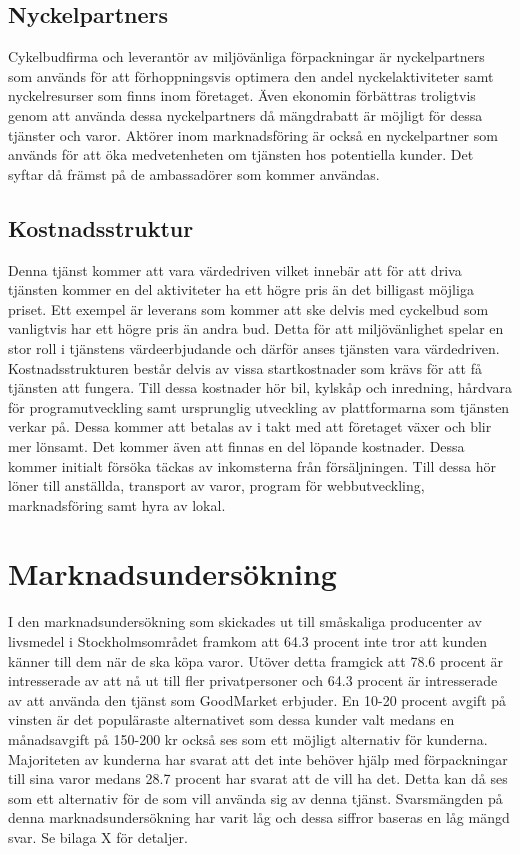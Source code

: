 \documentclass[10pt,a4paper,oneside]{article}
\begin{document}
\subsection{Nyckelpartners}
Cykelbudfirma och leverantör av miljövänliga förpackningar är nyckelpartners som används för att förhoppningsvis optimera den andel nyckelaktiviteter samt nyckelresurser som finns inom företaget. Även ekonomin förbättras troligtvis genom att använda dessa nyckelpartners då mängdrabatt är möjligt för dessa tjänster och varor. Aktörer inom marknadsföring är också en nyckelpartner som används för att öka medvetenheten om tjänsten hos potentiella kunder. Det syftar då främst på de ambassadörer som kommer användas. 

\subsection{Kostnadsstruktur}
Denna tjänst kommer att vara värdedriven vilket innebär att för att driva tjänsten kommer en del aktiviteter ha ett högre pris än det billigast möjliga priset. Ett exempel är leverans som kommer att ske delvis med cyckelbud som vanligtvis har ett högre pris än andra bud. Detta för att miljövänlighet spelar en stor roll i tjänstens värdeerbjudande och därför anses tjänsten vara värdedriven.\\ 

Kostnadsstrukturen består delvis av vissa startkostnader som krävs för att få tjänsten att fungera. Till dessa kostnader hör bil, kylskåp och inredning, hårdvara för programutveckling samt ursprunglig utveckling av plattformarna som tjänsten verkar på. Dessa kommer att betalas av i takt med att företaget växer och blir mer lönsamt. Det kommer även att finnas en del löpande kostnader. Dessa kommer initialt försöka täckas av inkomsterna från försäljningen. Till dessa hör löner till anställda, transport av varor, program för webbutveckling, marknadsföring samt hyra av lokal.  


\newpage

\section{Marknadsundersökning}
I den marknadsundersökning som skickades ut till småskaliga producenter av livsmedel i Stockholmsområdet framkom att 64.3 procent inte tror att kunden känner till dem när de ska köpa varor. Utöver detta framgick att 78.6 procent är intresserade av att nå ut till fler privatpersoner och 64.3 procent är intresserade av att använda den tjänst som GoodMarket erbjuder. En 10-20 procent avgift på vinsten är det populäraste alternativet som dessa kunder valt medans en månadsavgift på 150-200 kr också ses som ett möjligt alternativ för kunderna. Majoriteten av kunderna har svarat att det inte behöver hjälp med förpackningar till sina varor medans 28.7 procent har svarat att de vill ha det. Detta kan då ses som ett alternativ för de som vill använda sig av denna tjänst. Svarsmängden på denna marknadsundersökning har varit låg och dessa siffror baseras en låg mängd svar. Se bilaga X för detaljer. 
\end{document}
